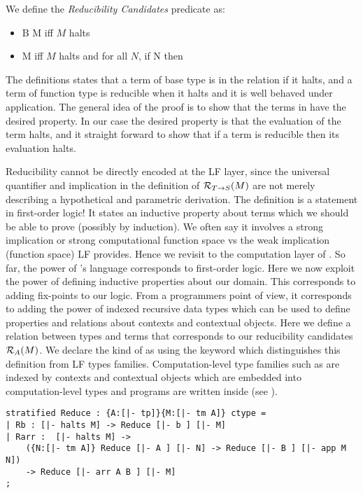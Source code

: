 We define the \emph{Reducibility Candidates} predicate as:

\begin{itemize}
\item \rc B M iff $M$ halts
\item {} M iff $M$ halts and for all $N$, if  N then 
\end{itemize}

The definitions states that a term of base type is in the relation if
it halts, and a term of function type is reducible when it halts and it is well
behaved under application. The general idea of the proof is to show
that the terms in  have the desired property. In our case the desired
property is that the evaluation of the term halts, and it straight
forward to show that if a term is reducible then its evaluation halts.

Reducibility cannot be directly encoded at the LF layer, since the
universal quantifier and implication in the definition of $\mathcal{R}_{T
  \rightarrow S}(M)$ are not merely describing a hypothetical and parametric
derivation. The definition is a statement in first-order logic! It
states an inductive property about terms which we should be able to prove
(possibly by induction). We often say it involves a strong implication
or strong computational function space vs the weak implication
(function space) LF provides. Hence we revisit to the
computation layer of \beluga. So far, the power of \beluga's language
corresponds to first-order logic. Here we now exploit the power of
defining inductive properties about our domain. This corresponds to
adding fix-points to our logic. From a programmers point of view, it
corresponds to adding the power of indexed recursive data types which
can be used to define properties and relations about contexts and
contextual objects. Here we define a relation  between
types  and terms  that corresponds to our reducibility
candidates $\mathcal{R}_{A}(M)$. We declare the kind of  as using the
keyword  which distinguishes this definition from LF types
families. Computation-level type families such as  are
indexed by contexts and contextual objects which are embedded into
computation-level types and programs are written inside \bel{[ ]} (see
\cite{Cave:POPL12}). 


\begin{lstlisting}
stratified Reduce : {A:[|- tp]}{M:[|- tm A]} ctype =
| Rb : [|- halts M] -> Reduce [|- b ] [|- M]
| Rarr :  [|- halts M] ->
    ({N:[|- tm A]} Reduce [|- A ] [|- N] -> Reduce [|- B ] [|- app M N])
    -> Reduce [|- arr A B ] [|- M]
;
\end{lstlisting}


